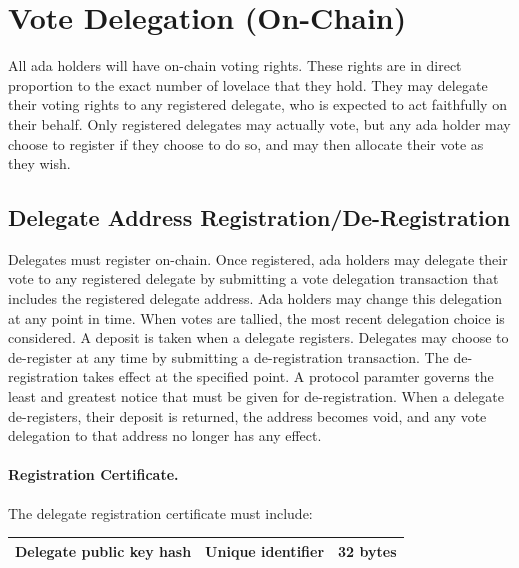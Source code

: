 \newpage
\section{Vote Delegation (On-Chain)}
\label{sect:delegation}

All ada holders will have on-chain voting rights.  These rights are in direct proportion to the exact number of lovelace that they hold.
They may delegate their voting rights to any registered delegate, who is expected to act faithfully on their behalf.
Only registered delegates may actually vote, but any ada holder may choose to register if they choose to do so, and may then
allocate their vote as they wish.

\subsection{Delegate Address Registration/De-Registration}
\label{sect:registration}

Delegates must register on-chain.  Once registered, ada holders may delegate their
vote to any registered delegate by submitting a vote delegation transaction that includes the registered delegate address.
Ada holders may change this delegation at any point in time.  When votes are tallied, the most recent delegation choice is considered.
A deposit is taken when a delegate registers.  Delegates may choose to de-register at any time by submitting a de-registration transaction.  The de-registration takes effect
at the specified point.  A protocol paramter governs the least and greatest notice that must be given for de-registration.  When a delegate de-registers, their deposit is returned,
the address becomes void, and any vote delegation to that address no longer has any effect.

\paragraph{Registration Certificate.} The delegate registration certificate must include:

\begin{tabular}{||l|p{3in}|l||}
  \hline\hline
  Delegate public key hash & Unique identifier & 32 bytes
  \\\hline
  \hline
\end{tabular}

